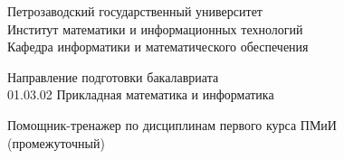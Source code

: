 \documentclass[a4paper,12pt]{article}
\renewcommand{\baselinestretch}{1.50}
\begin{document}

\thispagestyle{empty}
\begin{center}


\renewcommand{\baselinestretch}{1}
{\large
{\sc Петрозаводский государственный университет\\
Институт математики и информационных технологий\\
	Кафедра информатики и математического обеспечения
}
}

\end{center}


\begin{center}
%
%

%
% 
Направление подготовки бакалавриата \\
01.03.02 Прикладная математика и информатика 
\end{center}

\vfill

\begin{center}

	{\Large \sc Помощник-тренажер по дисциплинам первого курса ПМиИ} \\
	(промежуточный)
\end{center}

\medskip
\end{document}
